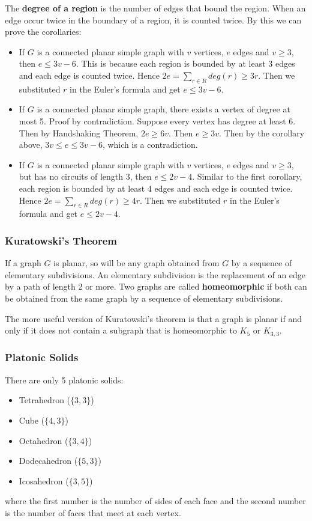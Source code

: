 \documentclass[a4paper,12pt]{article}
\begin{document}
The \textbf{degree of a region} is the number of edges that bound the region.
When an edge occur twice in the boundary of a region, it is counted twice.
By this we can prove the corollaries:
\begin{itemize}
	\item If $G$ is a connected planar simple graph with $v$ vertices, $e$ edges and $v \geq 3$, then $e \leq 3v - 6$.
		This is because each region is bounded by at least 3 edges and each edge is counted twice.
		Hence $2e = \sum_{r \in R} deg(r) \geq 3r$.
		Then we substituted $r$ in the Euler's formula and get $e \leq 3v - 6$.
	\item If $G$ is a connected planar simple graph, there exists a vertex of degree at most 5.
		Proof by contradiction.
		Suppose every vertex has degree at least 6.
		Then by Handshaking Theorem, $2e \geq 6v$.
		Then $e \geq 3v$.
		Then by the corollary above, $3v \leq e \leq 3v - 6$, which is a contradiction.
	\item If $G$ is a connected planar simple graph with $v$ vertices, $e$ edges and $v \geq 3$, but has no circuits of length 3, then $e \leq 2v - 4$.
		Similar to the first corollary, each region is bounded by at least 4 edges and each edge is counted twice.
		Hence $2e = \sum_{r \in R} deg(r) \geq 4r$.
		Then we substituted $r$ in the Euler's formula and get $e \leq 2v - 4$.
\end{itemize}

\subsubsection{Kuratowski's Theorem}

If a graph $G$ is planar, so will be any graph obtained from $G$ by a sequence of elementary subdivisions.
An elementary subdivision is the replacement of an edge by a path of length 2 or more.
Two graphs are called \textbf{homeomorphic} if both can be obtained from the same graph by a sequence of elementary subdivisions.

The more useful version of Kuratowski's theorem is that a graph is planar if and only if it does not contain a subgraph that is homeomorphic to $K_5$ or $K_{3,3}$.

\subsubsection{Platonic Solids}

There are only 5 platonic solids:
\begin{itemize}
	\item Tetrahedron ($\{3,3\}$)
	\item Cube ($\{4,3\}$)
	\item Octahedron ($\{3,4\}$)
	\item Dodecahedron ($\{5,3\}$)
	\item Icosahedron ($\{3,5\}$)
\end{itemize}
where the first number is the number of sides of each face and the second number is the number of faces that meet at each vertex.
\end{document}
